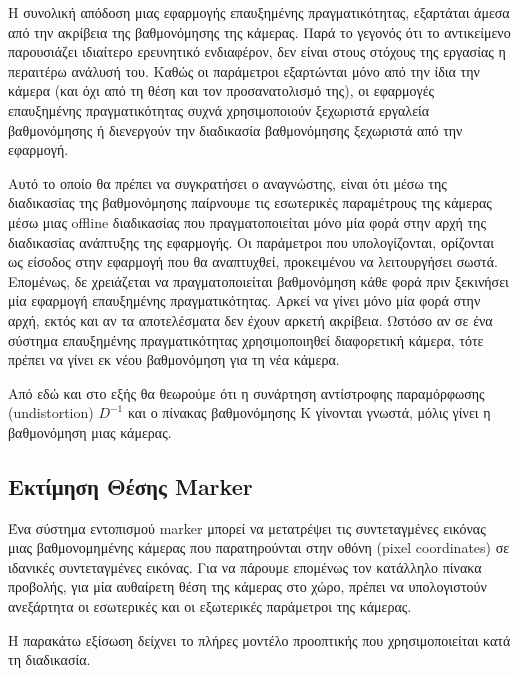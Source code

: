 Η συνολική απόδοση μιας εφαρμογής επαυξημένης πραγματικότητας, εξαρτάται άμεσα από την ακρίβεια της βαθμονόμησης της κάμερας. Παρά το γεγονός ότι το αντικείμενο παρουσιάζει ιδιαίτερο ερευνητικό ενδιαφέρον, δεν είναι στους στόχους της εργασίας η περαιτέρω ανάλυσή του. Καθώς οι παράμετροι εξαρτώνται μόνο από την ίδια την κάμερα (και όχι από τη θέση και τον προσανατολισμό της), οι εφαρμογές επαυξημένης πραγματικότητας συχνά χρησιμοποιούν ξεχωριστά εργαλεία βαθμονόμησης ή διενεργούν την διαδικασία βαθμονόμησης ξεχωριστά από την εφαρμογή. 



Αυτό το οποίο θα πρέπει να συγκρατήσει ο αναγνώστης, είναι ότι μέσω της διαδικασίας της βαθμονόμησης παίρνουμε τις εσωτερικές παραμέτρους της κάμερας μέσω μιας offline διαδικασίας που πραγματοποιείται μόνο μία φορά στην αρχή της διαδικασίας ανάπτυξης της εφαρμογής. Οι παράμετροι που υπολογίζονται, ορίζονται ως είσοδος στην εφαρμογή που θα αναπτυχθεί, προκειμένου να λειτουργήσει σωστά. Επομένως, δε χρειάζεται να πραγματοποιείται βαθμονόμηση κάθε φορά πριν ξεκινήσει μία εφαρμογή επαυξημένης πραγματικότητας. Αρκεί να γίνει μόνο μία φορά στην αρχή, εκτός και αν τα αποτελέσματα δεν έχουν αρκετή ακρίβεια. Ωστόσο αν σε ένα σύστημα επαυξημένης πραγματικότητας χρησιμοποιηθεί διαφορετική κάμερα, τότε πρέπει να γίνει εκ νέου βαθμονόμηση για τη νέα κάμερα. 


Από εδώ και στο εξής θα θεωρούμε ότι η συνάρτηση αντίστροφης παραμόρφωσης (undistortion) $D^{-1}$ και ο πίνακας βαθμονόμησης Κ γίνονται γνωστά, μόλις γίνει η βαθμονόμηση μιας κάμερας.







\subsection{Εκτίμηση Θέσης Marker}

Ένα σύστημα εντοπισμού marker μπορεί να μετατρέψει τις συντεταγμένες εικόνας μιας βαθμονομημένης κάμερας που παρατηρούνται στην οθόνη (pixel coordinates) σε ιδανικές συντεταγμένες εικόνας. 
Για να πάρουμε επομένως τον κατάλληλο πίνακα προβολής, για μία αυθαίρετη θέση της κάμερας στο χώρο, πρέπει να υπολογιστούν ανεξάρτητα οι εσωτερικές και οι εξωτερικές παράμετροι της κάμερας. 



Η παρακάτω εξίσωση δείχνει το πλήρες μοντέλο προοπτικής που χρησιμοποιείται κατά τη διαδικασία.


